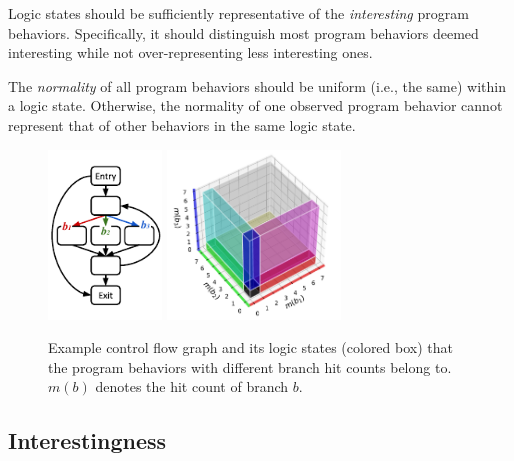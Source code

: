 \documentclass[letterpaper,twocolumn,10pt]{article}
\begin{document}
%
Logic states should be sufficiently representative of the \emph{interesting}
program behaviors. Specifically, it should distinguish most program behaviors
deemed interesting while not over-representing less interesting ones. 

%
The \emph{normality} of all program behaviors should be uniform (i.e., the same)
within a logic state. Otherwise, the normality of one observed program behavior
cannot represent that of other behaviors in the same logic state.
%

\begin{figure}[t]
  \centering
  \vspace{-1em}
  \includegraphics[height=4.5cm]{images/repr-cfg.pdf}
  \includegraphics[height=4.5cm]{images/repr-grid.pdf}
  \vspace{-.5em}
  \caption{Example control flow graph and its logic states (colored box) that
  the program behaviors with different branch hit counts belong to. $m(b)$
  denotes the hit count of branch $b$.}
  \label{f:repr}
\end{figure}

\subsection{Interestingness}
\label{s:prop:repr}
\end{document}
